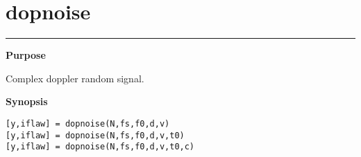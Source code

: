 


\section*{\hspace*{-1.6cm} dopnoise}

\vspace*{-.4cm}
\hspace*{-1.6cm}\rule[0in]{16.5cm}{.02cm}
\vspace*{.2cm}



{\bf \large \sf Purpose}\\
\hspace*{1.5cm}
\begin{minipage}[t]{13.5cm}
Complex doppler random signal.
\end{minipage}
\vspace*{.5cm}


{\bf \large \sf Synopsis}\\
\hspace*{1.5cm}
\begin{minipage}[t]{13.5cm}
\begin{verbatim}
[y,iflaw] = dopnoise(N,fs,f0,d,v)
[y,iflaw] = dopnoise(N,fs,f0,d,v,t0)
[y,iflaw] = dopnoise(N,fs,f0,d,v,t0,c)
\end{verbatim}
\end{minipage}
\vspace*{.5cm}


